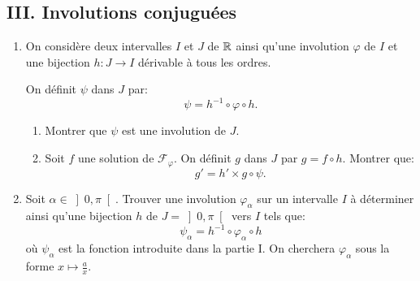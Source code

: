 \subsection*{III. Involutions conjuguées}
\begin{enumerate}
 \item On considère deux intervalles $I$ et $J$ de $\mathbb{R}$ ainsi qu'une involution $\varphi$ de $I$ et une bijection $h:J\to I$ dérivable à tous les ordres.

On définit $\psi$ dans $J$ par:
\[ \psi = h^{-1}\circ \varphi \circ h.\]

\begin{enumerate}
 \item Montrer que $\psi$ est une involution de $J$.
 \item Soit $f$ une solution de $\mathcal{F}_{\varphi}$. On définit $g$ dans $J$ par $g = f\circ h$. Montrer que:
 \[ g' = h' \times g\circ \psi.\]
\end{enumerate}
\item Soit $\alpha \in \left]0, \pi\right[$. Trouver une involution $\varphi_{\alpha}$ sur un intervalle $I$ à déterminer ainsi qu'une bijection $h$ de $J = \left]0, \pi\right[$ vers $I$ tels que:
\[ 
\psi_{\alpha} = h^{-1}\circ \varphi_{\alpha}\circ h
\]
où $\psi_{\alpha}$ est la fonction introduite dans la partie I. On cherchera $\varphi_{\alpha}$ sous la forme $x\mapsto \frac{a}{x}$. 
\end{enumerate}


